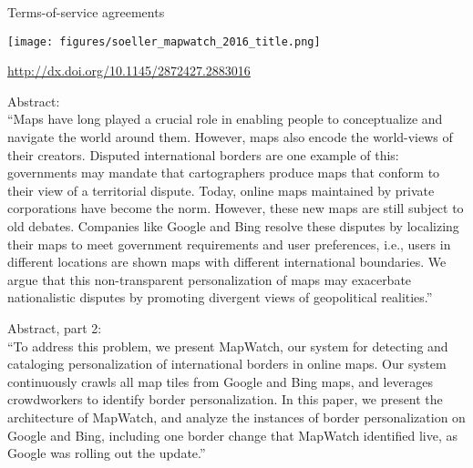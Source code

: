 \documentclass{beamer}
\def\vf{\vfill}
\begin{document}
\begin{frame}

Terms-of-service agreements

\end{frame}
\begin{frame}

\begin{center}
\texttt{[image: figures/soeller\_mapwatch\_2016\_title.png]}
\end{center}

\vf
\url{http://dx.doi.org/10.1145/2872427.2883016}
\end{frame}
\begin{frame}

Abstract:\\
``Maps have long played a crucial role in enabling people to conceptualize and navigate the world around them. However, maps also encode the world-views of their creators. Disputed international borders are one example of this: governments may mandate that cartographers produce maps that conform to their view of a territorial dispute. Today, online maps maintained by private corporations have become the norm. However, these new maps are still subject to old debates. Companies like Google and Bing resolve these disputes by localizing their maps to meet government requirements and user preferences, i.e., users in different locations are shown maps with different international boundaries. We argue that this non-transparent personalization of maps may exacerbate nationalistic disputes by promoting divergent views of geopolitical realities.''

\end{frame}
\begin{frame}

Abstract, part 2:\\
``To address this problem, we present MapWatch, our system for detecting and cataloging personalization of international borders in online maps. Our system continuously crawls all map tiles from Google and Bing maps, and leverages crowdworkers to identify border personalization. In this paper, we present the architecture of MapWatch, and analyze the instances of border personalization on Google and Bing, including one border change that MapWatch identified live, as Google was rolling out the update.''

\end{frame}
\end{document}

